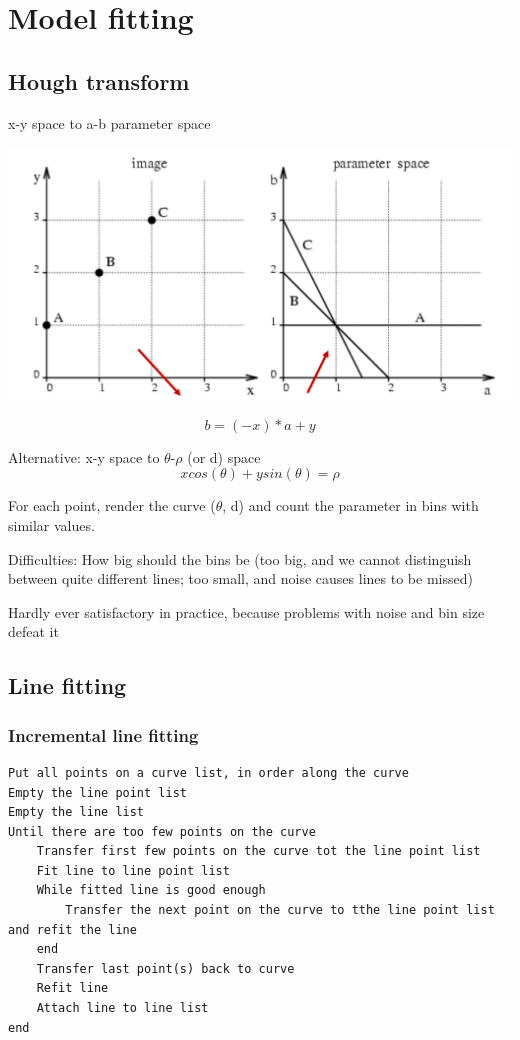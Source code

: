\section{Model fitting}

\subsection{Hough transform}

x-y space to a-b parameter space

\includegraphics[width=0.8\columnwidth]{pictures/hough}

$$b = (-x)*a+y$$

Alternative: x-y space to $\theta$-$\rho$ (or d) space
$$x cos(\theta) + y sin(\theta) = \rho$$

For each point, render the curve ($\theta$, d) and count the parameter in bins with similar values.

Difficulties: How big should the bins be (too big, and we cannot distinguish between quite different lines; too small, and noise causes lines to be missed)


Hardly ever satisfactory in practice, because problems with noise and bin size defeat it

\subsection{Line fitting}
\subsubsection{Incremental line fitting}
\begin{lstlisting}[frame=single]
Put all points on a curve list, in order along the curve
Empty the line point list
Empty the line list
Until there are too few points on the curve
	Transfer first few points on the curve tot the line point list
	Fit line to line point list
	While fitted line is good enough
		Transfer the next point on the curve to tthe line point list and refit the line
	end
	Transfer last point(s) back to curve
	Refit line
	Attach line to line list
end
\end{lstlisting}  

